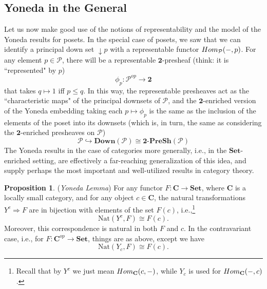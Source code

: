 \documentclass[11pt]{book}
\theoremstyle{definition}
\theoremstyle{definition}
\theoremstyle{definition}
\newtheorem{proposition}{Proposition}[section]
\theoremstyle{theorem}
\theoremstyle{definition}
\begin{document}
\subsection{Yoneda in the General}
Let us now make good use of the notions of representability and the model of the Yoneda results for posets. In the special case of posets, we saw that we can identify a principal down set $\downarrow p$ with a representable functor $Hom_{\mathcal{P}}(\--, p)$. For any element $p \in \mathcal{P}$, there will be a representable $\textbf{2}$-presheaf (think: it is ``represented" by $p$) 
\begin{equation*}
\phi_p: \mathcal{P}^{op} \rightarrow \textbf{2} 
\end{equation*}
that takes $q \mapsto 1$ iff $p \leq q$. In this way, the representable presheaves act as the ``characteristic maps" of the principal downsets of $\mathcal{P}$, and the $\textbf{2}$-enriched version of the Yoneda embedding taking each $p \mapsto \phi_p$ is the same as the inclusion of the elements of the poset into its downsets (which is, in turn, the same as considering the $\textbf{2}$-enriched presheaves on $\mathcal{P}$) 
\begin{equation*}
\mathcal{P} \hookrightarrow \textbf{Down}(\mathcal{P}) \cong \textbf{2-}\textbf{PreSh}(\mathcal{P})
\end{equation*} \noindent 
The Yoneda results in the case of categories more generally, i.e., in the $\textbf{Set}$-enriched setting, are effectively a far-reaching generalization of this idea, and supply perhaps the most important and well-utilized results in category theory.   
\begin{proposition}
	(\textit{Yoneda Lemma})  For any functor $F: \textbf{C} \rightarrow \textbf{Set}$, where $\textbf{C}$ is a locally small category, and for any object $c \in \textbf{C}$, the natural transformations $Y^c \Rightarrow F$ are in bijection with elements of the set $F(c)$, i.e.,\footnote{Recall that by $Y^c$ we just mean $Hom_{\textbf{C}}(c,\--)$, while $Y_c$ is used for $Hom_{\textbf{C}}(\--, c)$.}  
	\begin{equation}
	\text{Nat}(Y^c, F) \cong F(c).
	\end{equation} 
	Moreover, this correspondence is natural in both $F$ and $c$. In the contravariant case, i.e., for $F: \textbf{C}^{op} \rightarrow \textbf{Set}$, things are as above, except we have 
	\begin{equation}
	\text{Nat}(Y_c, F) \cong F(c).
	\end{equation} 
\end{proposition} 
\end{document}
